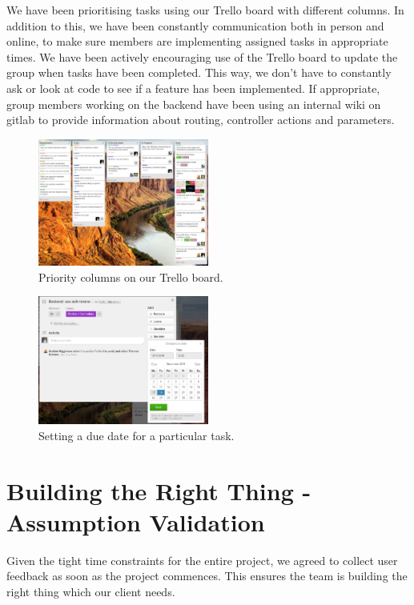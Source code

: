 \documentclass[a4paper]{article}
\begin{document}
We have been prioritising tasks using our Trello board with different
columns. In addition to this, we have been constantly communication both 
in person and online, to make sure members are implementing assigned tasks
in appropriate times. We have been actively encouraging use of the Trello 
board to update the group when tasks have been completed. This way, 
we don't have to constantly ask or look at code to see if a feature has 
been implemented. If appropriate, group members working on the backend
have been using an internal wiki on gitlab to provide information about
routing, controller actions and parameters. 


\begin{figure}[H]
  \centering
    \includegraphics[width = 0.5\textwidth]{./evaluation/trello-columns.png}

  \caption{Priority columns on our Trello board.}
  \label{fig:columns}
\end{figure}


\begin{figure}[H]
  \centering
    \includegraphics[width = 0.5\textwidth]{./evaluation/trello-due-date.png}

  \caption{Setting a due date for a particular task.}
  \label{fig:deadline}
\end{figure}

\section{Building the Right Thing - Assumption Validation}
Given the tight time constraints for the entire project, we agreed to collect
user feedback as soon as the project commences. This ensures the team
is building the right thing which our client needs.
\end{document}

